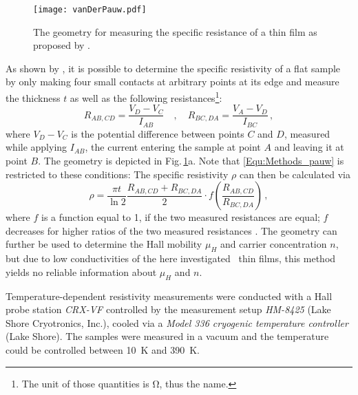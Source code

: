\begin{figure}
    \centering
    \texttt{[image: vanDerPauw.pdf]}
    \caption{The geometry for measuring the specific resistance of a thin film as proposed by \textcite{pauw1958}.}
    \label{Fig:Methods_pauwGeometry}
\end{figure}

As shown by \textcite{pauw1958}, it is possible to determine the specific resistivity of a flat sample by only making four small contacts at arbitrary points at its edge and measure the thickness $t$ as well as the following resistances\footnote{
    The unit of those quantities is \unit{\ohm}, thus the name.
}:
\begin{equation}
    R_{AB,CD}=\frac{V_D-V_C}{I_{AB}}\quad , \quad
    R_{BC,DA}=\frac{V_A-V_D}{I_{BC}}\,,
\end{equation}
where $V_D-V_C$ is the potential difference between points $C$ and $D$, measured while applying $I_{AB}$, the current entering the sample at point $A$ and leaving it at point $B$.
The geometry is depicted in Fig.\,\ref{Fig:Methods_pauwGeometry}a.
Note that \eqref{Equ:Methods_pauw} is restricted to these conditions:
The specific resistivity $\rho$ can then be calculated via
\begin{equation}
    \label{Equ:Methods_pauw}
    \rho=
    \frac{\pi t}{\ln2}
    \frac{R_{AB,CD}+R_{BC,DA}}{2}
    \cdot f\left(\frac{R_{AB,CD}}{R_{BC,DA}}\right)\,,
\end{equation}
where $f$ is a function equal to 1, if the two measured resistances are equal; $f$ decreases for higher ratios of the two measured resistances
    \cite{pauw1958}.
The geometry can further be used to determine the Hall mobility $\mu_H$ and carrier concentration $n$, but due to low conductivities of the here investigated \cro\ thin films, this method yields no reliable information about $\mu_H$ and $n$.

Temperature-dependent resistivity measurements were conducted with a Hall probe station \textit{CRX-VF} controlled by the measurement setup \textit{HM-8425} (Lake Shore Cryotronics, Inc.), cooled via a \textit{Model 336 cryogenic temperature controller} (Lake Shore).
The samples were measured in a vacuum and the temperature could be controlled between \qty{10}{\kelvin} and \qty{390}{\kelvin}.